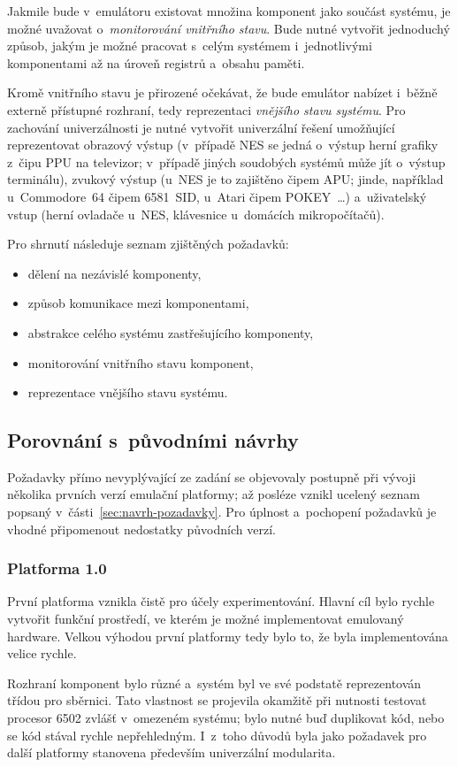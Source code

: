 Jakmile bude v~emulátoru existovat množina komponent jako součást systému, je možné uvažovat o~\emph{monitorování vnitřního stavu}. Bude nutné vytvořit jednoduchý způsob, jakým je možné pracovat s~celým systémem i~jednotlivými komponentami až na úroveň registrů a~obsahu paměti.

Kromě vnitřního stavu je přirozené očekávat, že bude emulátor nabízet i~běžně externě přístupné rozhraní, tedy reprezentaci \emph{vnějšího stavu systému}. Pro zachování univerzálnosti je nutné vytvořit univerzální řešení umožňující reprezentovat obrazový výstup (v~případě NES se jedná o~výstup herní grafiky z~čipu PPU na televizor; v~případě jiných soudobých systémů může jít o~výstup terminálu), zvukový výstup (u~NES je to zajištěno čipem APU; jinde, například u~Commodore~64 čipem 6581~SID, u~Atari čipem POKEY~\dots) a~uživatelský vstup (herní ovladače u~NES, klávesnice u~domácích mikropočítačů).

Pro shrnutí následuje seznam zjištěných požadavků:
\begin{itemize}
	\item dělení na nezávislé komponenty,
	\item způsob komunikace mezi komponentami,
	\item abstrakce celého systému zastřešujícího komponenty,
	\item monitorování vnitřního stavu komponent,
	\item reprezentace vnějšího stavu systému.
\end{itemize}

\subsection{Porovnání s~původními návrhy}
Požadavky přímo nevyplývající ze zadání se objevovaly postupně při vývoji několika prvních verzí emulační platformy; až posléze vznikl ucelený seznam popsaný v~části~\ref{sec:navrh-pozadavky}. Pro úplnost a~pochopení požadavků je vhodné připomenout nedostatky původních verzí.

\subsubsection{Platforma 1.0}
První platforma vznikla čistě pro účely experimentování. Hlavní cíl bylo rychle vytvořit funkční prostředí, ve kterém je možné implementovat emulovaný hardware. Velkou výhodou první platformy tedy bylo to, že byla implementována velice rychle.

Rozhraní komponent bylo různé a~systém byl ve své podstatě reprezentován třídou pro sběrnici. Tato vlastnost se projevila okamžitě při nutnosti testovat procesor 6502 zvlášť v~omezeném systému; bylo nutné buď duplikovat kód, nebo se kód stával rychle nepřehledným. I~z~toho důvodů byla jako požadavek pro další platformy stanovena především univerzální modularita.

